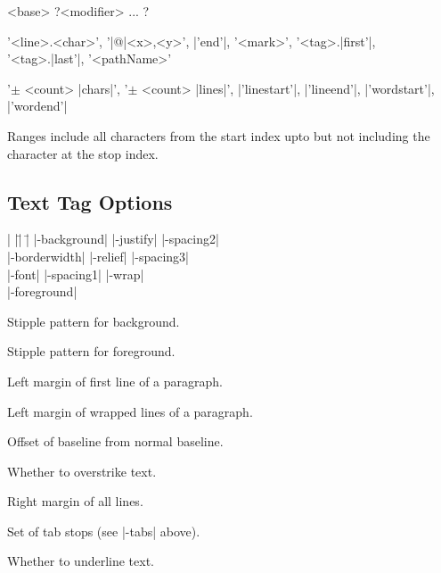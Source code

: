 \begin{enum}{2cm}

 <base> ?<modifier> ... ?

 '<line>.<char>', '|@|<x>,<y>', |'end'|, '<mark>', 
	   '<tag>.|first'|, '<tag>.|last'|, '<pathName>'

 '$\pm$ <count> |chars|', '$\pm$ <count> |lines|', |'linestart'|,
	       |'lineend'|, |'wordstart'|, |'wordend'|

 Ranges include all characters from the start index upto
but not including the character at the stop index.

\end{enum}
 
\subsection*{Text Tag Options}
\begin{tabbing}
|                    |\=|                    |\= \kill
|-background|         \> |-justify|         \> |-spacing2| \\
|-borderwidth|        \> |-relief|          \> |-spacing3| \\
|-font|               \> |-spacing1|        \> |-wrap| \\
|-foreground|      
\end{tabbing}

\vskip5pt
\begin{enum}{4.5cm}

 Stipple pattern for background.

 Stipple pattern for foreground.

 Left margin of first line of a paragraph.  

 Left margin of wrapped lines of a paragraph. 

 Offset of baseline from normal baseline. 

 Whether to overstrike text.

 Right margin of all lines. 

 Set of tab stops (see |-tabs| above).

 Whether to underline text. 

\end{enum}

